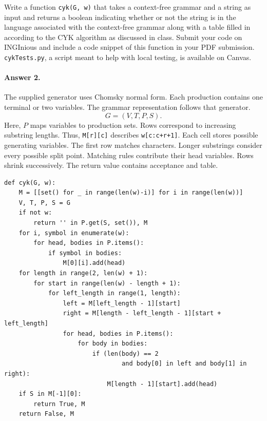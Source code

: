 \documentclass{article}
\begin{document}
\begin{enumerate}
    Write a function \verb|cyk(G, w)| that takes a context-free grammar and a string as input and returns a boolean indicating whether or not the string is in the language associated with the context-free grammar along with a table filled in according to the CYK algorithm as discussed in class. Submit your code on INGInious and include a code snippet of this function in your PDF submission. \verb|cykTests.py|, a script meant to help with local testing, is available on Canvas.


\paragraph{Answer 2.}\mbox{}\par
The supplied generator uses Chomsky normal form.
Each production contains one terminal or two variables.
The grammar representation follows that generator.
\[
G=(V,T,P,S).
\]
Here, $P$ maps variables to production sets.
Rows correspond to increasing substring lengths.
Thus, \texttt{M[r][c]} describes \texttt{w[c:c+r+1]}.
Each cell stores possible generating variables.
The first row matches characters.
Longer substrings consider every possible split point.
Matching rules contribute their head variables.
Rows shrink successively.
The return value contains acceptance and table.

\par\noindent\begin{minipage}{\linewidth}
\begin{lstlisting}
def cyk(G, w):
    M = [[set() for _ in range(len(w)-i)] for i in range(len(w))]
    V, T, P, S = G
    if not w:
        return '' in P.get(S, set()), M
    for i, symbol in enumerate(w):
        for head, bodies in P.items():
            if symbol in bodies:
                M[0][i].add(head)
    for length in range(2, len(w) + 1):
        for start in range(len(w) - length + 1):
            for left_length in range(1, length):
                left = M[left_length - 1][start]
                right = M[length - left_length - 1][start + left_length]
                for head, bodies in P.items():
                    for body in bodies:
                        if (len(body) == 2
                                and body[0] in left and body[1] in right):
                            M[length - 1][start].add(head)
    if S in M[-1][0]:
        return True, M
    return False, M
\end{lstlisting}
\end{minipage}\par


\end{enumerate}
\end{document}
